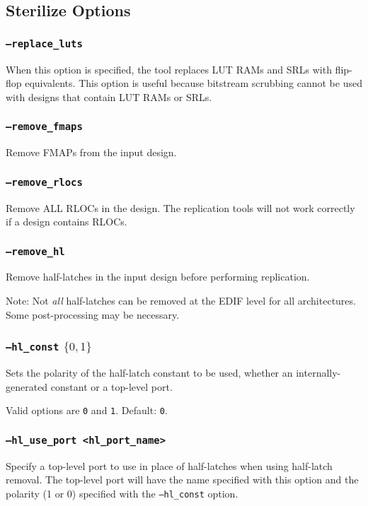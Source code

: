 \subsection{Sterilize Options}

\subsubsection{\texttt{--replace\_luts}}
When this option is specified, the tool replaces LUT RAMs and SRLs
with flip-flop equivalents. This option is useful because bitstream
scrubbing cannot be used with designs that contain LUT RAMs or SRLs.

\subsubsection{\texttt{--remove\_fmaps}}
Remove FMAPs from the input design.

\subsubsection{\texttt{--remove\_rlocs}}
Remove ALL RLOCs in the design.  The replication tools will not work
correctly if a design contains RLOCs.

\subsubsection{\texttt{--remove\_hl}}
Remove half-latches in the input design before performing replication.

Note: Not \emph{all} half-latches can be removed at the EDIF 
level for all architectures. Some post-processing may be necessary.

\subsubsection{\texttt{--hl\_const} $\{0,1\}$}
Sets the polarity of the half-latch constant to be used, whether an 
internally-generated constant or a top-level port. 

Valid options are \texttt{0} and \texttt{1}. Default: \texttt{0}.

\subsubsection{\texttt{--hl\_use\_port <hl\_port\_name>}}
Specify a top-level port to use in place of half-latches when 
using half-latch removal. The top-level port will have the name specified with 
this option and the polarity (1 or 0) specified with the \texttt{--hl\_const} 
option.

